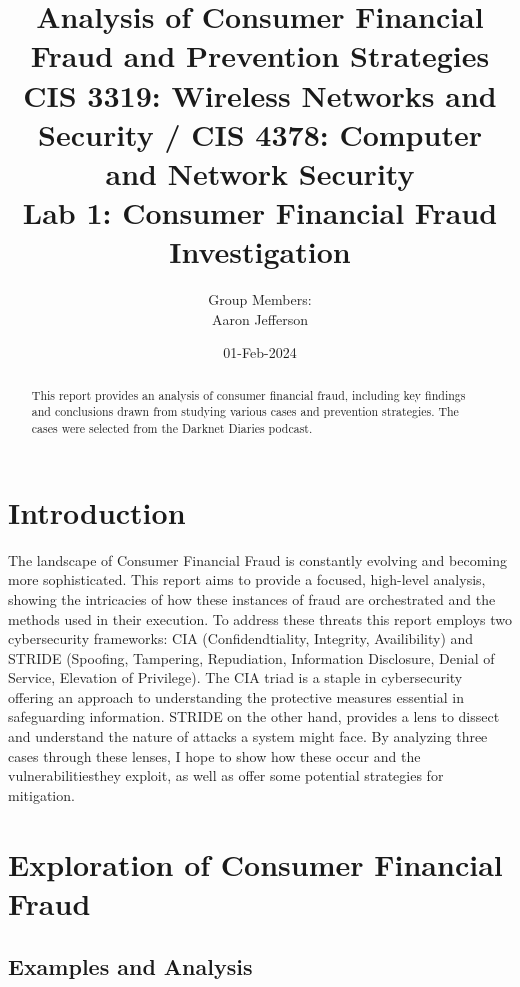 \documentclass[11pt]{article}
\title{Analysis of Consumer Financial Fraud and Prevention Strategies \\
\large CIS 3319: Wireless Networks and Security / CIS 4378: Computer and Network Security \\
\large Lab 1: Consumer Financial Fraud Investigation}
\author{Group Members: \\ Aaron Jefferson \\ }
\date{01-Feb-2024}
\begin{document}
\maketitle

\begin{abstract}
\noindent This report provides an analysis of consumer financial fraud, including key findings and conclusions drawn from studying various cases and prevention strategies. The cases were selected from the Darknet Diaries podcast. 
\end{abstract}

\tableofcontents

\section{Introduction}
The landscape of Consumer Financial Fraud is constantly evolving and becoming more sophisticated. This report aims to provide a focused, high-level analysis, showing the intricacies of how these instances of fraud are orchestrated and the methods used in their execution.
To address these threats this report employs two cybersecurity frameworks: CIA (Confidendtiality, Integrity, Availibility) and STRIDE (Spoofing, Tampering, Repudiation, Information Disclosure, Denial of Service, Elevation of Privilege). The CIA triad is a staple in cybersecurity offering an approach to understanding the protective measures essential in safeguarding information. STRIDE on the other hand, provides a lens to dissect and understand the nature of attacks a system might face. By analyzing three cases through these lenses, I hope to show how these occur and the vulnerabilitiesthey exploit, as well as offer some potential strategies for mitigation.
\section{Exploration of Consumer Financial Fraud}
\subsection{Examples and Analysis}
\end{document}
